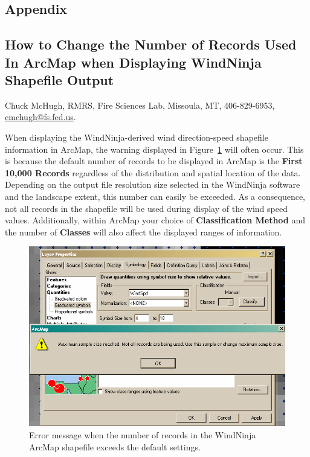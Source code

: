 \documentclass[12pt]{article}
\begin{document}
\renewcommand{\thefigure}{\arabic{figure}}
\setcounter{figure}{0}

\pagebreak
\begin{centering}
\section*{Appendix}
\label{section:appendix}

\subsection*{How to Change the Number of Records Used In ArcMap when Displaying WindNinja Shapefile Output}
Chuck McHugh, RMRS, Fire Sciences Lab, Missoula, MT, 406-829-6953, \href{mailto:cmchugh@fs.fed.us}{cmchugh@fs.fed.us}.
\end{centering}
\newline
When displaying the WindNinja-derived wind direction-speed shapefile information in ArcMap, the warning
displayed in Figure~\ref{fig:Figure13} will often occur. This is because the default number of records to be displayed in ArcMap is
the \textbf{First 10,000 Records} regardless of the distribution and spatial location of the data. Depending on the output
file resolution size selected in the WindNinja software and the landscape extent, this number can easily be
exceeded. As a consequence, not all records in the shapefile will be used during display of the wind speed values.
Additionally, within ArcMap your choice of \textbf{Classification Method} and the number of \textbf{Classes} will also affect
the displayed ranges of information.
\begin{figure}[H]
	\centering
	\includegraphics[scale=0.7]{arc_13.png}
	\caption{Error message when the number of records in the WindNinja ArcMap shapefile exceeds the default
settings.}
\label{fig:Figure13}
\end{figure}
\end{document}
